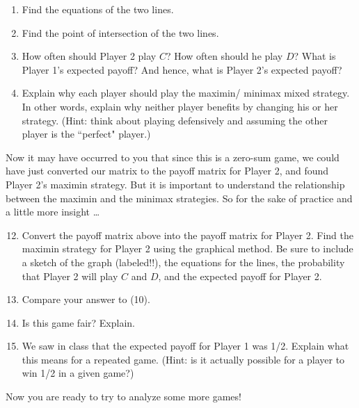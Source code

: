 \begin{enumerate}
\item Find the equations of the two lines.
\vspace{.1in}
\item Find the point of intersection of the two lines.
\vspace{.1in}
\item How often should Player 2 play $C$? How often should he play $D$? What is Player 1's expected payoff? And hence, what is Player 2's expected payoff? 
\vspace{.1in}

\item Explain why each player should play the maximin/ minimax mixed strategy. In other words, explain why neither player benefits by changing his or her strategy. (Hint: think about playing defensively and assuming the other player is the ``perfect" player.)
\vspace{.1in}



\end{enumerate}

Now it may have occurred to you that since this is a zero-sum game, we could have just converted our matrix to the payoff matrix for Player 2, and found Player 2's maximin strategy. But it is important to understand the relationship between the maximin and the minimax strategies. So for the sake of practice and a little more insight \ldots

\begin{enumerate}
\setcounter{enumi}{11}

\item Convert the payoff matrix above into the payoff matrix for Player 2. Find the maximin strategy for Player 2 using the graphical method. Be sure to include a sketch of the graph (labeled!!), the equations for the lines, the probability that Player 2 will play $C$ and $D$, and the expected payoff for Player 2.
\vspace{.1 in}

\item Compare your answer to (10). 
\vspace{.1 in}

\item Is this game fair? Explain.
\vspace{.1in}

\item We saw in class that the expected payoff for Player 1 was 1/2. Explain what this means for a repeated game. (Hint: is it actually possible for a player to win 1/2 in a given game?)
\vspace{.1 in}

\end{enumerate}
\noindent
Now you are ready to try to analyze some more games!

